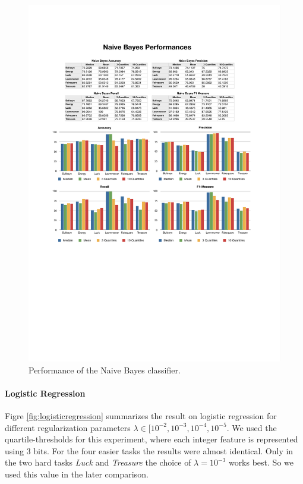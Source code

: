 %
\begin{figure}
    \centering
    \setlength{\tabcolsep}{0.0130\linewidth}
    \includegraphics[width=\linewidth]{figures/NaiveBayes}
    \caption{Performance of the Naive Bayes classifier.%
      \label{fig:naivebayes}}
\end{figure}

\paragraph*{Logistic Regression}
Figre \ref{fig:logisticregression} summarizes the result on logistic regression for different regularization parameters $\lambda \in [10^{-2}, 10^{-3}, 10^{-4}, 10^{-5}$. We used the quartile-thresholds for this experiment, where each integer feature is represented using 3 bits. For the four easier tasks the results were almost identical. Only in the two hard tasks \emph{Luck} and \emph{Treasure} the choice of $\lambda = 10^{-3}$ works best. So we used this value in the later comparison.

